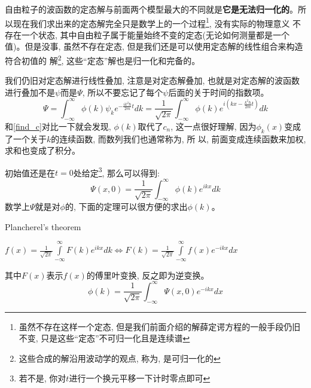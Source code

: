 \documentclass[a4paper,zihao=-4,linespread=1]{ctexrep}
\newenvironment{lequation}{\large\begin{equation}}{\end{equation}}
\begin{document}
    自由粒子的波函数的定态解与前面两个模型最大的不同就是\textbf{它是无法归一化的}。所以现在我们求出来的定态解完全只是数学上的一个过程\footnote{虽然不存在这样一个定态, 但是我们前面介绍的解薛定谔方程的一般手段仍旧不变, 只是这些“定态”不可归一化且是连续谱}, 没有实际的物理意义
    不存在一个状态, 其中自由粒子属于能量始终不变的定态(无论如何测量都是一个值)。但是没事, 虽然不存在定态, 但是我们还是可以使用定态解的线性组合来构造符合初值的
    解\footnote{这些合成的解沿用波动学的观点, 称为, 是可归一化的}, 这些“定态”解也是归一化和完备的。

    我们仍旧对定态解进行线性叠加, 注意是对定态解叠加, 也就是对定态解的波函数进行叠加不是$\psi$而是$\Psi$, 所以不要忘记了每个$\psi$后面的关于时间的指数项。
    \begin{lequation}
        \label{2.26}
        \boxed{
            \Psi=\int_{-\infty}^{\infty}\phi(k)\psi_ke^{-\frac{ik^2\hbar}{2m}t}dk=\frac{1}{\sqrt{2\pi}}\int_{-\infty}^{\infty}\phi(k)e^{i\left(kx-\frac{k^2\hbar}{2m}t\right)}dk  
        }
    \end{lequation}
    和\ref{find_c}对比一下就会发现, $\phi(k)$取代了$c_n$, 这一点很好理解, 因为$\phi_k(x)$变成了一个关于$k$的连续函数, 而数列我们也通常称为, 所
    以, 前面变成连续函数来加权, 求和也变成了积分。

    初始值还是在$t=0$处给定\footnote{若不是, 你对$t$进行一个换元平移一下计时零点即可}, 那么可以得到:
    \begin{lequation}
        \Psi(x,0)=\frac{1}{\sqrt{2\pi}}\int_{-\infty}^{\infty}\phi(k)e^{ikx}dk  
    \end{lequation}
    数学上$\Psi$就是对$\phi$的, 下面的定理可以很方便的求出$\phi(k)$。
    \begin{theorem}{Plancherel's theorem}
        \begin{center}
            \begin{math}
                \displaystyle
                f(x)=\frac{1}{\sqrt{2\pi}} \int\limits_{-\infty}^{\infty}F(k)e^{ikx}dk\Longleftrightarrow F(k)=\frac{1}{\sqrt{2\pi}} \int\limits_{-\infty}^{\infty}f(x)e^{-ikx}dx
            \end{math}
        \end{center}
    \end{theorem}

    其中$F(x)$表示$f(x)$的傅里叶变换, 反之即为逆变换。
    \begin{lequation}
        \boxed{
            \phi(k)=\frac{1}{\sqrt{2\pi}} \int _{-\infty}^{\infty}\Psi(x,0)e^{-ikx}dx
        }
    \end{lequation}
    
\end{document}
